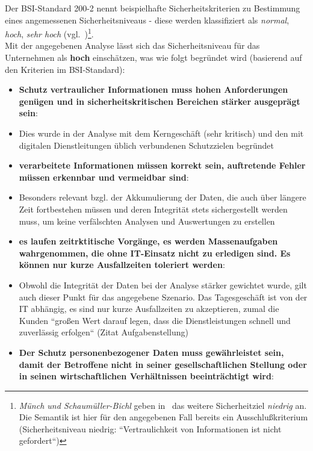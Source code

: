 Der BSI-Standard 200-2 nennt beispielhafte Sicherheitskriterien zu Bestimmung eines angemessenen Sicherheitsniveaus - diese werden klassifiziert als \textit{normal}, \textit{hoch}, \textit{sehr hoch} (vgl.~\cite[24 f.]{BSI200-2})\footnote{
    \textit{Münch und Schaumüller-Bichl} geben in~\cite[37]{ITS2} das weitere Sicherheitziel \textit{niedrig} an. Die Semantik ist hier für den angegebenen Fall bereits ein Ausschlußkriterium (Sicherheitsniveau niedrig: ``Vertraulichkeit von Informationen ist nicht gefordert``)
}.\\


Mit der angegebenen Analyse lässt sich das Sicherheitsniveau für das Unternehmen als \textbf{hoch} einschätzen, was wie folgt begründet wird (basierend auf den Kriterien im BSI-Standard):


\begin{itemize}
    \itemsep0.5em
    \item \textbf{Schutz vertraulicher Informationen muss hohen Anforderungen genügen und in sicherheitskritischen Bereichen stärker ausgeprägt sein}:
    \item[] Dies wurde in der Analyse mit dem Kerngeschäft (sehr kritisch) und den mit digitalen Dienstleitungen üblich verbundenen Schutzzielen begründet
    \item \textbf{verarbeitete Informationen müssen korrekt sein, auftretende Fehler müssen erkennbar und vermeidbar sind}:
    \item[] Besonders relevant bzgl. der Akkumulierung der Daten, die auch über längere Zeit fortbestehen müssen und deren Integrität stets sichergestellt werden muss, um keine verfälschten Analysen und Auswertungen zu erstellen
    \item \textbf{es laufen zeitrktitische  Vorgänge, es werden Massenaufgaben wahrgenommen, die ohne IT-Einsatz nicht zu erledigen sind. Es können nur kurze Ausfallzeiten toleriert werden}:
    \item[] Obwohl die Integrität der Daten bei der Analyse stärker gewichtet wurde, gilt auch dieser Punkt für das angegebene Szenario. Das Tagesgeschäft ist von der IT abhängig, es sind nur kurze Ausfallzeiten zu akzeptieren, zumal die Kunden ``großen Wert darauf legen, dass die Dienstleistungen schnell und zuverlässig erfolgen`` (Zitat Aufgabenstellung)
    \item \textbf{Der Schutz personenbezogener Daten muss gewährleistet sein, damit der Betroffene nicht in seiner gesellschaftlichen Stellung oder in seinen wirtschaftlichen Verhältnissen beeinträchtigt wird}:

\end{itemize}
